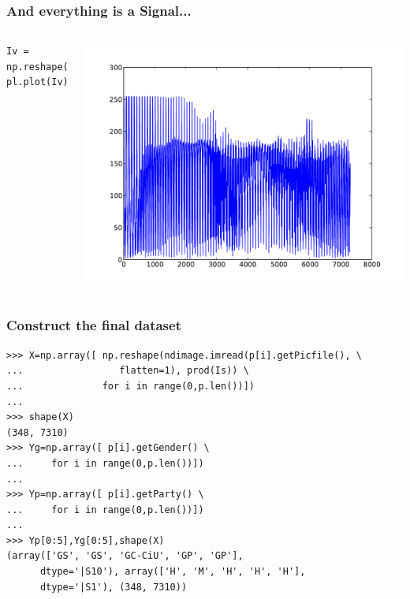 \documentclass[10pt, colorlinks]{beamer}
\begin{document}
\begin{frame}[fragile]\frametitle{And everything is a Signal...}

\begin{columns}

\begin{verbatim}
Iv = np.reshape(I,prod(Is))
pl.plot(Iv)
\end{verbatim}
\includegraphics[width=\textwidth]{plwfigis/CursP_4_figure23}

\end{columns}

\end{frame}
\begin{frame}[fragile]\frametitle{Construct the final dataset}
\begin{verbatim}
>>> X=np.array([ np.reshape(ndimage.imread(p[i].getPicfile(), \
...                 flatten=1), prod(Is)) \
...              for i in range(0,p.len())])
... 
>>> shape(X)
(348, 7310)
>>> Yg=np.array([ p[i].getGender() \
...     for i in range(0,p.len())])
... 
>>> Yp=np.array([ p[i].getParty() \
...     for i in range(0,p.len())])
... 
>>> Yp[0:5],Yg[0:5],shape(X)
(array(['GS', 'GS', 'GC-CiU', 'GP', 'GP'], 
      dtype='|S10'), array(['H', 'M', 'H', 'H', 'H'], 
      dtype='|S1'), (348, 7310))
\end{verbatim}

\end{frame}
\end{document}
